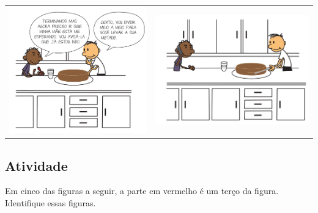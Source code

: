 \begin{refletindo*}[breakable]{}{}
  \noindent  \noindent\begin{tabular}{ll}
    \includegraphics[width=180pt, keepaspectratio]{../figuras/licao01/reflet_fig03.png}   & \includegraphics[width=200pt, keepaspectratio]{../figuras/licao01/reflet_fig04.png}
  \end{tabular}




\end{refletindo*}


\subsection{Atividade}

Em cinco das figuras a seguir, a parte em vermelho é um terço da figura. Identifique essas figuras.

